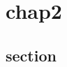 \documentclass[10pt,a4j,openany,dvipdfmx]{jsbook}
\begin{document}
\chapter{chap2} %
\label{cha:chap2}

\section{section} %
\label{sec:section}




\end{document}
